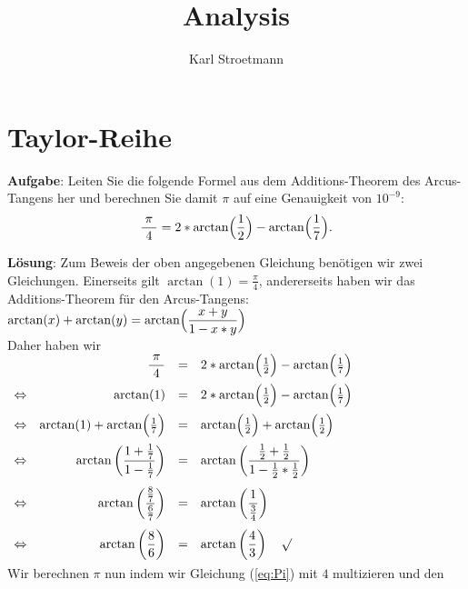 \documentclass{article}
\title{Analysis}
\author{Karl Stroetmann}
\newcommand{\bruch}[2]{\displaystyle\frac{\;\displaystyle#1\;}{\;\displaystyle#2\;}}
\begin{document}
\noindent
\section{Taylor-Reihe}
\textbf{Aufgabe}: Leiten Sie die folgende Formel aus dem Additions-Theorem des
Arcus-Tangens her und berechnen Sie damit $\pi$ auf eine Genauigkeit von $10^{-9}$:
\begin{equation}
  \label{eq:Pi}
  \bruch{\pi}{4} =  2 * \arctan\Bigl(\frac{1}{2}\Bigr) -\arctan\Bigl(\frac{1}{7}\Bigr).  
\end{equation}

\noindent
\textbf{L\"osung}:
Zum Beweis der oben angegebenen Gleichung ben\"otigen wir zwei
Gleichungen.  Einerseits gilt $\arctan(1) = \frac{\pi}{4}$, andererseits haben wir das
Additions-Theorem f\"ur den Arcus-Tangens: 
\\[0.3cm]
\hspace*{1.3cm}
$\displaystyle \arctan(x) + \arctan(y) = \arctan\Bigl(\frac{x + y}{1 - x*y}\Bigr)$
\\[0.3cm]
Daher haben wir
\\[0.3cm]
\hspace*{1.3cm}
$
\begin{array}[t]{lrcl}
                 & \bruch{\pi}{4}  & = & 2 * \arctan\Bigl(\frac{1}{2}\Bigr) -\arctan\Bigl(\frac{1}{7}\Bigr) \\[0.3cm]
 \Leftrightarrow & \arctan(1)      & = & 2 * \arctan\Bigl(\frac{1}{2}\Bigr) -\arctan\Bigl(\frac{1}{7}\Bigr) \\[0.3cm]
 \Leftrightarrow & \arctan(1) + \arctan\Bigl(\frac{1}{7}\Bigr) & = & \arctan\Bigl(\frac{1}{2}\Bigr) + \arctan\Bigl(\frac{1}{2}\Bigr) \\[0.3cm]
 \Leftrightarrow & \displaystyle \arctan\left( \frac{1 + \frac{1}{7}}{1 - \frac{1}{7}}\right) & = & 
                   \displaystyle \arctan\left( \frac{\frac{1}{2} + \frac{1}{2}}{1 - \frac{1}{2}*\frac{1}{2}}\right) \\[0.5cm]
 \Leftrightarrow & \displaystyle \arctan\left( \frac{\frac{8}{7}}{\frac{6}{7}}\right) & = & 
                   \displaystyle \arctan\left( \frac{1}{\frac{3}{4}}\right) \\[0.5cm]
 \Leftrightarrow & \displaystyle \arctan\left( \frac{8}{6} \right) & = & 
                   \displaystyle \arctan\left( \frac{4}{3} \right) \quad\surd\\[0.3cm]
\end{array}
$
\\[0.3cm]
Wir berechnen $\pi$ nun indem wir Gleichung (\ref{eq:Pi}) mit $4$ multizieren und den
\end{document}
